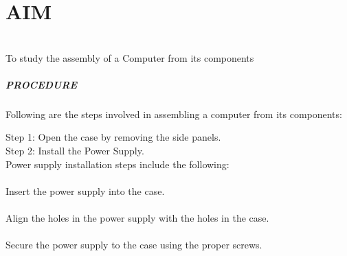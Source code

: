 



\renewcommand{\abstractname}{\Large AIM}
\chapter{AIM} \vspace{0.5cm}
\\To study the assembly of a Computer from its components \vspace{0.5cm}
\paragraph{PROCEDURE\\}
Following are the steps involved in assembling a computer from its components:

{Step 1}: Open the case by removing the side panels.\\

{Step 2}: Install the Power Supply.\\

Power supply installation steps include the following:\\

\\Insert the power supply into the case.\\
\\Align the holes in the power supply with the holes in the case.\\
\\Secure the power supply to the case using the proper screws.\\

